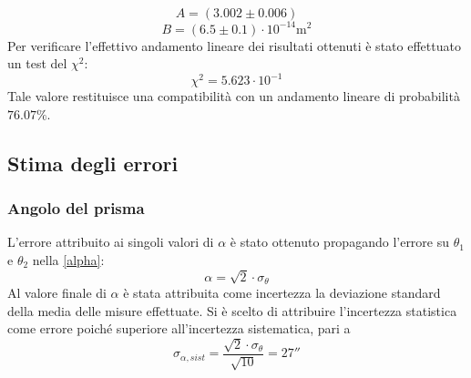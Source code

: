 \documentclass[]{article}
\let\oldsubsection\subsection%
\renewcommand{\subsection}{%
	\renewcommand{\theequation}{\thesubsection.\arabic{equation}}%
	\oldsubsection}%
\begin{document}
    \begin{equation}
        \label{A}
        A = (3.002 \pm 0.006) 
    \end{equation}
    \begin{equation}
        \label{B}
        B = (6.5 \pm 0.1) \cdot 10^{-14} \text{m}^2
    \end{equation}
    Per verificare l'effettivo andamento lineare dei risultati ottenuti è stato effettuato un test del $\chi^2$:
    \begin{equation}
        \label{chi2}
        \chi^2 = 5.623 \cdot 10^{-1} 
    \end{equation}
    Tale valore restituisce una compatibilità con un andamento lineare di probabilità $76.07 \% $.
    
    \subsection{Stima degli errori}
    \subsubsection{Angolo del prisma}
    L'errore attribuito ai singoli valori di $\alpha$ è stato ottenuto propagando l'errore su $\theta_1$ e $\theta_2$ nella \ref{alpha}:
    \begin{equation}
        \label{alpha-err}
        \alpha = \sqrt{2} \cdot \sigma_{\theta} 
    \end{equation}
    Al valore finale di $\alpha$ è stata attribuita come incertezza la deviazione standard della media delle misure effettuate. Si è scelto di attribuire l'incertezza statistica come errore poiché superiore all'incertezza sistematica, pari a
    \begin{equation}
        \label{alpha-err-sist}
        \sigma_{\alpha, sist}= \frac{\sqrt{2} \cdot \sigma_{\theta}}{\sqrt{10}}=27''
    \end{equation}
    \label{par:alpha_err}
\end{document}
